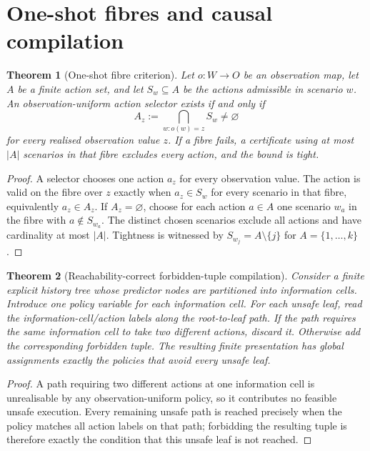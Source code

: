 \documentclass[11pt]{article}
\theoremstyle{plain}
\newtheorem{theorem}{Theorem}[section]
\theoremstyle{definition}
\theoremstyle{remark}
\begin{document}
\section{One-shot fibres and causal compilation}
\label{sec:fibres-compilation}

\begin{theorem}[One-shot fibre criterion]
Let \(o:W\to O\) be an observation map, let \(A\) be a finite action set, and
let \(S_w\subseteq A\) be the actions admissible in scenario \(w\).  An
observation-uniform action selector exists if and only if
\[
  A_z:=\bigcap_{w:o(w)=z}S_w\ne\varnothing
\]
for every realised observation value \(z\).  If a fibre fails, a certificate
using at most \(|A|\) scenarios in that fibre excludes every action, and the
bound is tight.
\end{theorem}

\begin{proof}
A selector chooses one action \(a_z\) for every observation value.  The action is
valid on the fibre over \(z\) exactly when \(a_z\in S_w\) for every scenario in
that fibre, equivalently \(a_z\in A_z\).  If \(A_z=\varnothing\), choose for each
action \(a\in A\) one scenario \(w_a\) in the fibre with \(a\notin S_{w_a}\).
The distinct chosen scenarios exclude all actions and have cardinality at most
\(|A|\).  Tightness is witnessed by \(S_{w_j}=A\setminus\{j\}\) for
\(A=\{1,\ldots,k\}\).
\end{proof}

\begin{theorem}[Reachability-correct forbidden-tuple compilation]
Consider a finite explicit history tree whose predictor nodes are partitioned
into information cells.  Introduce one policy variable for each information
cell.  For each unsafe leaf, read the information-cell/action labels along the
root-to-leaf path.  If the path requires the same information cell to take two
different actions, discard it.  Otherwise add the corresponding forbidden tuple.
The resulting finite presentation has global assignments exactly the policies
that avoid every unsafe leaf.
\end{theorem}

\begin{proof}
A path requiring two different actions at one information cell is unrealisable
by any observation-uniform policy, so it contributes no feasible unsafe
execution.  Every remaining unsafe path is reached precisely when the policy
matches all action labels on that path; forbidding the resulting tuple is
therefore exactly the condition that this unsafe leaf is not reached.
\end{proof}
\end{document}
